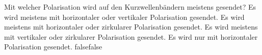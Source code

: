     {Mit welcher Polarisation wird auf den Kurzwellenbändern meistens gesendet?}
    {Es wird meistens mit horizontaler oder vertikaler Polarisation gesendet.}
    {Es wird meistens mit horizontaler oder zirkularer Polarisation gesendet.}
    {Es wird meistens mit vertikaler oder zirkularer Polarisation gesendet.}
    {Es wird nur mit horizontaler Polarisation gesendet.}
    {false}{false}